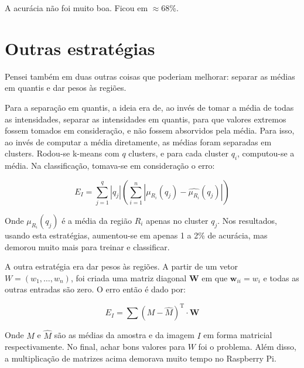 \documentclass[12pt]{article}
\theoremstyle{plain}
\numberwithin{equation}{section}
\begin{document}
A acurácia não foi muito boa. Ficou em $\approx 68$\%.

\section{Outras estratégias}

Pensei também em duas outras coisas que poderiam melhorar: separar as médias em quantis e dar pesos
às regiões.

Para a separação em quantis, a ideia era de, ao invés de tomar a média de todas as intensidades,
separar as intensidades em quantis, para que valores extremos fossem tomados em consideração, e não
fossem absorvidos pela média. Para isso, ao invés de computar a média diretamente, as médias foram
separadas em clusters. Rodou-se k-means com $q$ clusters, e para cada cluster $q_i$, computou-se a
média. Na classificação, tomava-se em consideração o erro:

\begin{equation*}
  E_I = \sum_{j=1}^q |q_j|\left( \sum_{i=1}^n |\mu_{R_i}(q_j)-\hat{\mu_{R_i}}(q_j)|\right)
\end{equation*}

Onde $\mu_{R_i}(q_j)$ é a média da região $R_i$ apenas no cluster $q_j$. Nos resultados, usando
esta estratégias, aumentou-se em apenas 1 a 2\% de acurácia, mas demorou muito mais para treinar e
classificar.

A outra estratégia era dar pesos às regiões. A partir de um vetor $W=(w_1,\ldots,w_n)$, foi criada
uma matriz diagonal $\mathbf{W}$ em que $\mathbf{w}_{ii}=w_i$ e todas as outras entradas são zero.
O erro então é dado por:

\begin{equation*}
  E_I = \sum {(M-\hat{M})}^{\text{T}}\cdot\mathbf{W}
\end{equation*}

Onde $M$ e $\hat{M}$ são as médias da amostra e da imagem $I$ em forma matricial respectivamente. No
final, achar bons valores para $W$ foi o problema.  Além disso, a multiplicação de matrizes acima
demorava muito tempo no Raspberry Pi.
\end{document}
